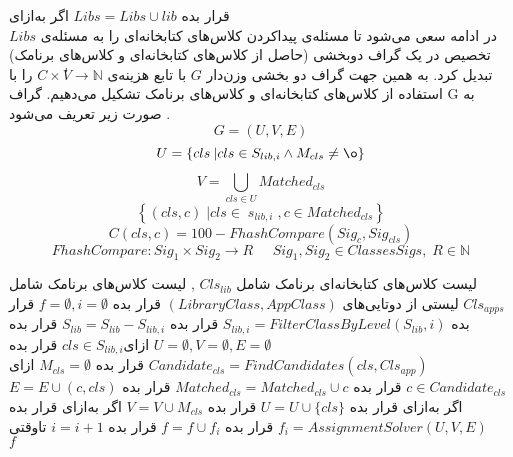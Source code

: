   قرار‌ بده $Libs = Libs \cup lib$
 ‌اگر
‌به‌ازای\\
 $Libs$
در ادامه سعی می‌شود تا مسئله‌ی پیداکردن کلاس‌های کتابخانه‌ای را به مسئله‌ی تخصیص در یک گراف دوبخشی (حاصل از کلاس‌های کتابخانه‌ای و کلاس‌های برنامک) تبدیل کرد. به همین جهت گراف دو بخشی وزن‌دار  $G$ با تابع هزینه‌ی
 $C\times  ٰV \rightarrow \mathbb{N}$ 
 را با استفاده از کلاس‌های کتابخانه‌ای و کلاس‌های برنامک تشکیل می‌دهیم. گراف G به صورت زیر تعریف می‌شود .
   \begin{equation}
 	G = (U,V,E)
 \end{equation}
\begin{equation}
 	U = \left \{ cls \:| cls \in S_{lib,i} \wedge M_{cls} \neq \o   \right \}
\end{equation}
\begin{equation}
	V = \bigcup_{cls \in U}^{} Matched_{cls}
\end{equation}
\begin{equation}
\left \{ (cls,c)\; | cls \in \; s_{lib,i} \; , c \in Matched_{cls} \right \}
\end{equation}
\begin{equation}
	C(cls,c) = 100 - FhashCompare(Sig_{c} , Sig_{cls})
\end{equation}
\begin{equation}
	FhashCompare: Sig_{1} \times Sig_{2} \rightarrow R \;\;\;\;\; Sig_{1} , Sig_{2} \in ClassesSigs, \; R \in  \mathbb{N}
\end{equation}

 لیست کلاس‌های کتابخانه‌ای برنامک شامل $Cls_{lib}$ , لیست کلاس‌های برنامک شامل $Cls_{apps}$
 لیستی از دوتایی‌های $(LibraryClass,AppClass)$
 قرار بده $f=\emptyset , i=\emptyset$
 قرار بده $S_{lib,i} = FilterClassByLevel(S_{lib} , i)$
 قرار بده $S_{lib} = S_{lib} - S_{lib,i}$
 قرار بده $U = \emptyset , V = \emptyset , E = \emptyset$
‌ازای{$cls \in S_{lib,i}$}
 قرار بده {$Candidate_{cls} = ‫‪FindCandidates‬‬(cls,Cls_{app})$}
 قرار بده  $M_{cls} = \emptyset$
‌ازای $c \in Candidate_{cls}$
 قرار بده $Matched_{cls}= Matched_{cls} \cup {c}$
 قرار بده $E = E \cup {(c,cls)}$
‌اگر
‌به‌ازای
 قرار بده $U = U \cup \{cls\}$
 قرار بده $V = V \cup M_{cls}$
‌اگر
‌به‌ازای 
 قرار بده {$f_{i} = ‫‪AssignmentSolver‬‬(U,V,E)$}
 قرار بده $f = f \cup f_{i}$
 قرار بده $i=i+1$
‌تاوقتی\\
 $f$

